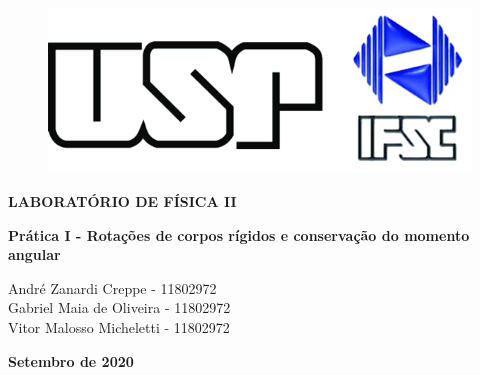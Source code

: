 \thispagestyle{empty}

\begin{figure}
  \centering
  \includegraphics[scale=0.4]{images/logo-usp-ifsc.png}
  \vspace*{-0.3cm}
\end{figure}

\begin{center}
{\large \rm \textbf {LABORATÓRIO DE FÍSICA II} \linebreak}
\end{center}

\baselineskip 30pt

\vspace*{0.3cm}

\begin{center}
{\LARGE \bfseries Prática I - Rotações de corpos rígidos e conservação do momento angular}
\end{center}

\vspace*{1cm}

\setcounter{footnote}{1}

\renewcommand{\thefootnote}{\fnsymbol{footnote}}
\begin{center}
{
    \sc  André Zanardi Creppe - 11802972 \\
    \sc  Gabriel Maia de Oliveira - 11802972 \\
    \sc  Vitor Malosso Micheletti - 11802972 \\
}
\vspace*{0.5cm}

\vspace*{-.5cm}
\end{center}


\baselineskip 17pt

\vspace*{1.5cm}
\begin{center}
{{\bf Setembro de 2020}}
\end{center}

\vspace*{.05cm}

\renewcommand{\thefootnote}{\arabic{footnote}}

\setcounter{footnote}{1}

\pagebreak

\baselineskip 19pt

